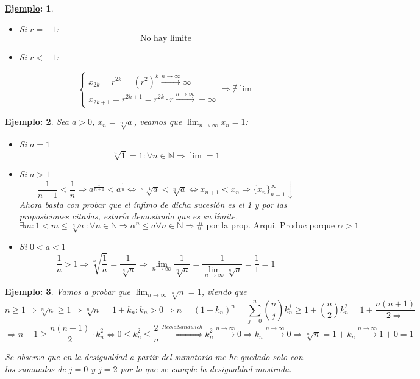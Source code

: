 \documentclass[10pt,a4paper,openright]{book}
\theoremstyle{break}
\newtheorem*{ej}{\underline{Ejemplo}:}
\begin{document}
\begin{ej}
\begin{itemize}
\item Si $r=-1$:
$$\mbox{No hay límite}$$

\item Si $r<-1$:

$$\begin{cases}x_{2k}=r^{2k}=(r^2)^k\stackrel{n\rightarrow \infty}{\rightarrow} \infty \\
x_{2k+1}=r^{2k+1}=r^{2k}\cdot r \stackrel{n\rightarrow \infty}{\rightarrow} -\infty\end{cases}\Rightarrow \nexists \lim$$
\end{itemize}
\end{ej}


\begin{ej}
Sea $a>0$, $x_n=\sqrt[n]{a}$, veamos que $\lim_{n\rightarrow \infty}x_n=1$:
\begin{itemize}
\item Si $a=1$
$$\sqrt[n]{1}=1:\forall n\in \mathbb N\Rightarrow \lim =1$$

\item Si $a>1$
$$\frac{1}{n+1}<\frac{1}{n}\Rightarrow a^{\frac{1}{n+1}}<a^{\frac{1}{n}}\Leftrightarrow \sqrt[n+1]{a}<\sqrt[n]{a}\Leftrightarrow x_{n+1}< x_n\Rightarrow \{x_n\}_{n=1}^\infty \downarrow$$
Ahora basta con probar que el ínfimo de dicha sucesión es el 1 y por las proposiciones citadas, estaría demostrado que es su límite.
$$\exists m: 1<m\leq \sqrt[n]{a}: \forall n\in \mathbb N\Rightarrow \alpha^n\leq a \forall n\in \mathbb N\Rightarrow \#\mbox{ por la prop. Arqui. Produc porque }\alpha>1$$

\item Si $0<a<1$
$$\frac{1}{a}>1\Rightarrow \sqrt[n]{\frac{1}{a}}=\frac{1}{\sqrt[n]{a}}\Rightarrow \lim_{n\rightarrow \infty} \frac{1}{\sqrt[n]{a}}=\frac{1}{\lim_{n\rightarrow \infty} \sqrt[n]{a}}=\frac{1}{1}=1$$
\end{itemize}
\end{ej}

\begin{ej}
Vamos a probar que $\lim_{n\rightarrow \infty}\sqrt[n]{n}=1$, viendo que
$$n\geq 1\Rightarrow \sqrt[n]{n}\geq 1\Rightarrow \sqrt[n]{n}=1+k_n: k_n>0\Rightarrow n=(1+k_n)^n=\sum_{j=0}^n \binom{n}{j}k_n^j\geq 1+\binom{n}{2}k_n^2=1+\frac{n(n+1)}{2\Rightarrow}$$
$$\Rightarrow n-1\geq \frac{n(n+1)}{2}\cdot k_n^2\Leftrightarrow 0\leq k_n^2\leq \frac{2}{n}\stackrel{ReglaSandwich}{\Rightarrow} k_n^2\stackrel{n\rightarrow \infty}{\rightarrow} 0\Rightarrow k_n\stackrel{n\rightarrow \infty}{\rightarrow} 0\Rightarrow \sqrt[n]{n}=1+k_n \stackrel{n\rightarrow \infty}{\rightarrow} 1+0=1$$

Se observa que en la desigualdad a partir del sumatorio me he quedado solo con los sumandos de $j=0$ y $j=2$ por lo que se cumple la desigualdad mostrada.
\end{ej}
\end{document}
